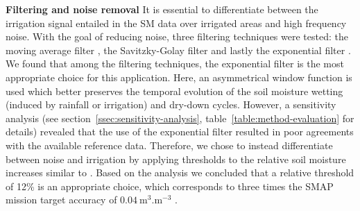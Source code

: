 \documentclass[hess, manuscript]{copernicus}
\begin{document}
\textbf{Filtering and noise removal}
It is essential to differentiate between the irrigation signal entailed in the SM data over irrigated areas and high frequency noise. With the goal of reducing noise, three filtering techniques were tested: the moving average filter \citep{brocca2013scaling}, the Savitzky-Golay filter \citep{savitzky1964smoothing} and lastly the exponential filter \citep{wagner1999method,Albergel2008}. We found that among the filtering techniques, the exponential filter is the most appropriate choice for this application. Here, an asymmetrical window function is used which better preserves the temporal evolution of the soil moisture wetting (induced by rainfall or irrigation) and dry-down cycles. However, a sensitivity analysis (see section~\ref{ssec:sensitivity-analysis}, table~\ref{table:method-evaluation} for details) revealed that the use of the exponential filter resulted in poor agreements with the available reference data. Therefore, we chose to instead differentiate between noise and irrigation by applying thresholds to the relative soil moisture increases similar to \citet{dorigo2013global}. Based on the analysis we concluded that a relative threshold of 12\% is an appropriate choice, which corresponds to three times the SMAP mission target accuracy of $0.04~\si{\m^{3}.\m^{-3}}$ \citep{entekhabi2010soil}.

\end{document}
